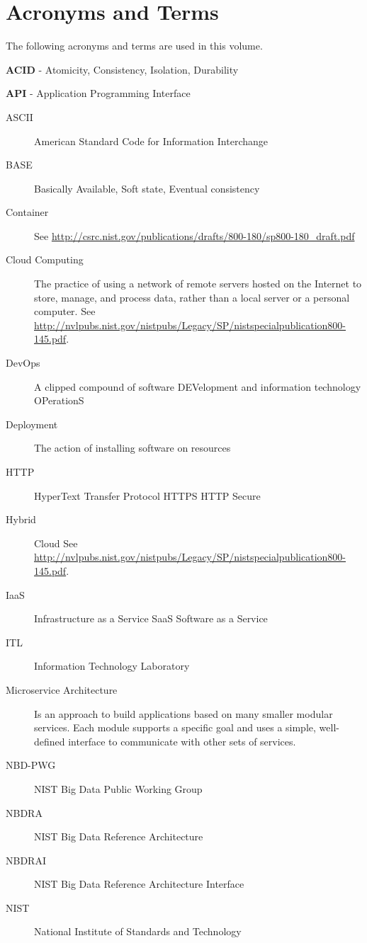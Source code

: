 \documentclass[9pt,]{article}
\begin{document}
\hypertarget{acronyms-and-terms}{%
\section{Acronyms and Terms}\label{acronyms-and-terms}}

The following acronyms and terms are used in this volume.

\textbf{ACID} - Atomicity, Consistency, Isolation, Durability

\textbf{API} - Application Programming Interface

\begin{description}
\item[ASCII]
American Standard Code for Information Interchange
\item[BASE]
Basically Available, Soft state, Eventual consistency
\item[Container]
See
\url{http://csrc.nist.gov/publications/drafts/800-180/sp800-180_draft.pdf}
\item[Cloud Computing]
The practice of using a network of remote servers hosted on the Internet
to store, manage, and process data, rather than a local server or a
personal computer. See
\url{http://nvlpubs.nist.gov/nistpubs/Legacy/SP/nistspecialpublication800-145.pdf}.
\item[DevOps]
A clipped compound of software DEVelopment and information technology
OPerationS
\item[Deployment]
The action of installing software on resources
\item[HTTP]
HyperText Transfer Protocol HTTPS HTTP Secure
\item[Hybrid]
Cloud See
\url{http://nvlpubs.nist.gov/nistpubs/Legacy/SP/nistspecialpublication800-145.pdf}.
\item[IaaS]
Infrastructure as a Service SaaS Software as a Service
\item[ITL]
Information Technology Laboratory
\item[Microservice Architecture]
Is an approach to build applications based on many smaller modular
services. Each module supports a specific goal and uses a simple,
well-defined interface to communicate with other sets of services.
\item[NBD-PWG]
NIST Big Data Public Working Group
\item[NBDRA]
NIST Big Data Reference Architecture
\item[NBDRAI]
NIST Big Data Reference Architecture Interface
\item[NIST]
National Institute of Standards and Technology

\end{description}
\end{document}
